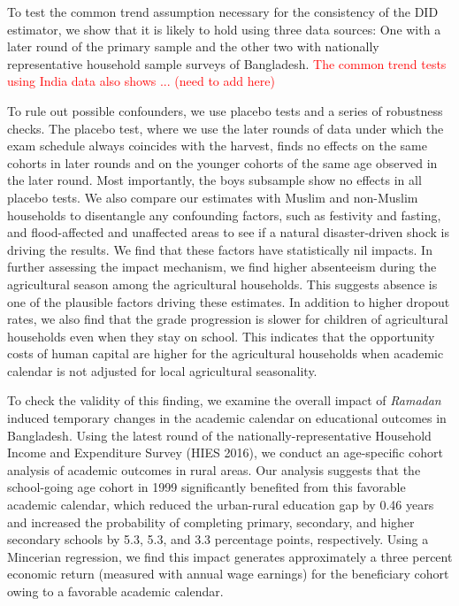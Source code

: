 \documentclass[12pt,letterpaper]{article}
\newcommand{\SAdded}[1]{\textcolor{red}{#1}}
\newcommand{\0}{\ensuremath{\mbox{\boldmath $0$}}}
\begin{document}
To test the common trend assumption necessary for the consistency of the DID estimator, we show that it is likely to hold using three data sources: One with a later round of the primary sample and the other two with nationally representative household sample surveys of Bangladesh. \SAdded{The common trend tests using India data also shows ... (need to add here)}

To rule out possible confounders, we use placebo tests and a series of robustness checks. The placebo test, where we use the later rounds of data under which the exam schedule always coincides with the harvest, finds no effects on the same cohorts in later rounds and on the younger cohorts of the same age observed in the later round. Most importantly, the boys subsample show no effects in all placebo tests. We also compare our estimates with Muslim and non-Muslim households to disentangle any confounding factors, such as festivity and fasting, and flood-affected and unaffected areas to see if a natural disaster-driven shock is driving the results. We find that these factors have statistically nil impacts. In further assessing the impact mechanism, we find higher absenteeism during the agricultural season among the agricultural households. This suggests absence is one of the plausible factors driving these estimates. In addition to higher dropout rates, we also find that the grade progression is slower for children of agricultural households even when they stay on school. This indicates that the opportunity costs of human capital are higher for the agricultural households when academic calendar is not adjusted for local agricultural seasonality. 

To check the validity of this finding, we examine the overall impact of \textit{Ramadan} induced temporary changes in the academic calendar on educational outcomes in Bangladesh. Using the latest round of the nationally-representative Household Income and Expenditure Survey (HIES 2016), we conduct an age-specific cohort analysis of academic outcomes in rural areas. Our analysis suggests that the school-going age cohort in 1999 significantly benefited from this favorable academic calendar, which reduced the urban-rural education gap by 0.46 years and increased the probability of completing primary, secondary, and higher secondary schools by 5.3, 5.3, and 3.3 percentage points, respectively. Using a Mincerian regression, we find this impact generates approximately a three percent economic return (measured with annual wage earnings) for the beneficiary cohort owing to a favorable academic calendar.
\end{document}
